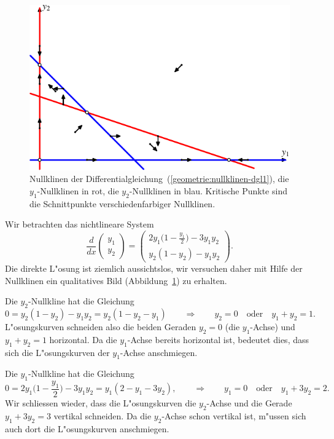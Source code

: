 \begin{beispiel}
\begin{figure}
\centering
\includegraphics{chapters/images/nullklinen-1.pdf}
\caption{Nullklinen der Differentialgleichung~(\ref{geometrie:nullklinen-dgl1}),
die $y_1$-Nullklinen in rot, die $y_2$-Nullklinen in blau.
Kritische Punkte sind die Schnittpunkte verschiedenfarbiger Nullklinen.
\label{geometrie:nullklinen1}}
\end{figure}
Wir betrachten das nichtlineare System 
\begin{equation}
\frac{d}{dx} \begin{pmatrix}y_1\\y_2\end{pmatrix}
=
\begin{pmatrix}
2y_1\biggl(1-\displaystyle\frac{y_1}2\biggr)-3y_1y_2\\
y_2(1-y_2)-y_1y_2
\end{pmatrix}.
\label{geometrie:nullklinen-dgl1}
\end{equation}
Die direkte L"osung ist ziemlich aussichtslos, wir versuchen daher mit
Hilfe der Nullklinen ein qualitatives Bild
(Abbildung~\ref{geometrie:nullklinen1}) zu erhalten.

Die $y_2$-Nullkline hat die Gleichung
\[
0=y_2(1-y_2)-y_1y_2=y_2(1-y_2-y_1)
\qquad\Rightarrow\qquad
y_2=0
\quad\text{oder}\quad
y_1+y_2=1.
\]
L"osungskurven schneiden also die beiden Geraden $y_2=0$ (die $y_1$-Achse)
und $y_1+y_2=1$ horizontal.
Da die $y_1$-Achse bereits horizontal ist, bedeutet dies, dass sich die
L"osungskurven der $y_1$-Achse anschmiegen.

Die $y_1$-Nullkline hat die Gleichung
\[
0=2y_1\biggl(1-\frac{y_1}2\biggr)-3y_1y_2=y_1(2-y_1-3y_2),
\qquad\Rightarrow\qquad
y_1=0
\quad\text{oder}\quad
y_1+3y_2=2.
\]
Wir schliessen wieder, dass die L"osungskurven die $y_2$-Achse und
die Gerade $y_1+3y_2=3$ vertikal schneiden.
Da die $y_2$-Achse schon vertikal ist, m"ussen sich auch dort
die L"osungskurven anschmiegen.


\end{beispiel}
